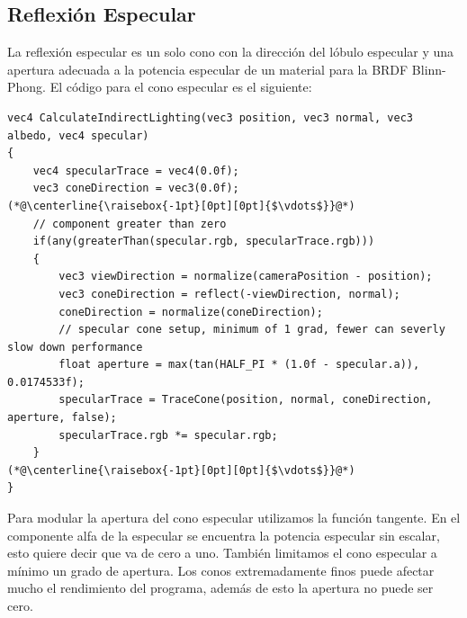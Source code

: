 \subsection{Reflexión Especular} %
\label{sub:reflexion_especular}
La reflexión especular es un solo cono con la dirección del lóbulo especular y una apertura adecuada a la potencia especular de un material para la \ac{BRDF} Blinn-Phong. El código para el cono especular es el siguiente:
\\
\begin{lstlisting}[caption={Cono para reflexión especular.}, label=Trace4]
vec4 CalculateIndirectLighting(vec3 position, vec3 normal, vec3 albedo, vec4 specular)
{
    vec4 specularTrace = vec4(0.0f);
    vec3 coneDirection = vec3(0.0f);
(*@\centerline{\raisebox{-1pt}[0pt][0pt]{$\vdots$}}@*)
    // component greater than zero
    if(any(greaterThan(specular.rgb, specularTrace.rgb)))
    {
        vec3 viewDirection = normalize(cameraPosition - position);
        vec3 coneDirection = reflect(-viewDirection, normal);
        coneDirection = normalize(coneDirection);
        // specular cone setup, minimum of 1 grad, fewer can severly slow down performance
        float aperture = max(tan(HALF_PI * (1.0f - specular.a)), 0.0174533f);
        specularTrace = TraceCone(position, normal, coneDirection, aperture, false);
        specularTrace.rgb *= specular.rgb;
    }
(*@\centerline{\raisebox{-1pt}[0pt][0pt]{$\vdots$}}@*)
}
\end{lstlisting}
Para modular la apertura del cono especular utilizamos la función tangente. En el componente alfa de la especular se encuentra la potencia especular sin escalar, esto quiere decir que va de cero a uno. También limitamos el cono especular a mínimo un grado de apertura. Los conos extremadamente finos puede afectar mucho el rendimiento del programa, además de esto la apertura no puede ser cero.
